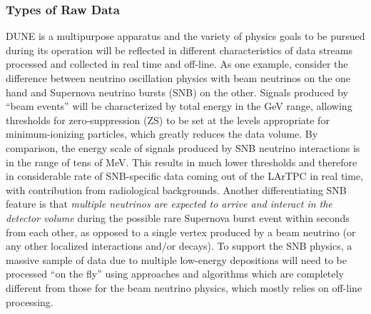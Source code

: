 \subsubsection{Types of Raw Data}
DUNE is a multipurpose apparatus and the variety of physics goals to be pursued during its operation
will be reflected in different characteristics of data streams processed and collected in real time and off-line.
As one example, consider the difference between neutrino oscillation physics with beam neutrinos
on the one hand and Supernova neutrino bursts (SNB) on the other.
Signals produced by ``beam events'' will be characterized by total energy in the GeV range, allowing
thresholds for zero-suppression (ZS) to be set at the levels appropriate for
minimum-ionizing particles, which greatly reduces the
data volume. By comparison, the energy scale of signals produced by
SNB neutrino interactions is in the range of tens
of MeV. This results in much lower thresholds and therefore
in considerable rate of SNB-specific data coming
out of the LArTPC in real time, with contribution from radiological backgrounds.
Another differentiating SNB feature is that \textit{multiple neutrinos are expected
to arrive and interact in the detector volume} during the possible rare Supernova burst event within seconds
from each other, as opposed to a single vertex produced by a beam neutrino (or any other localized
interactions and/or decays).
To support the SNB physics, a massive sample of data due to multiple low-energy
depositions will need to be processed ``on the fly''
using approaches and algorithms which are completely  different from those for the
beam neutrino physics, which mostly relies on off-line processing.


